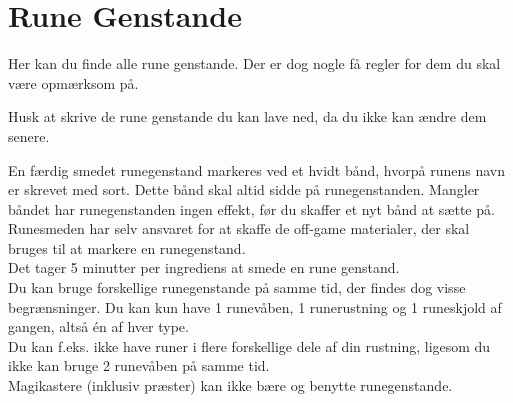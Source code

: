 \chapter*{Rune Genstande}

Her kan du finde alle rune genstande. Der er dog nogle få regler for dem du skal være opmærksom på. 

Husk at skrive de rune genstande du kan lave ned, da du ikke kan ændre dem senere.

En færdig smedet runegenstand markeres ved et hvidt bånd, hvorpå runens navn er skrevet med sort. Dette bånd skal altid sidde på runegenstanden. Mangler båndet har runegenstanden ingen effekt, før du skaffer et nyt bånd at sætte på. Runesmeden har selv ansvaret for at skaffe de off-game materialer, der skal bruges til at markere en runegenstand.\\

Det tager 5 minutter per ingrediens at smede en rune genstand.\\

Du kan bruge forskellige runegenstande på samme tid, der findes dog visse begrænsninger. Du kan
kun have 1 runevåben, 1 runerustning og 1 runeskjold af gangen, altså én af hver type.\\
Du kan f.eks. ikke have runer i flere forskellige dele af din rustning, ligesom du ikke kan bruge 2
runevåben på samme tid.\\

Magikastere (inklusiv præster) kan ikke bære og benytte runegenstande.\\

